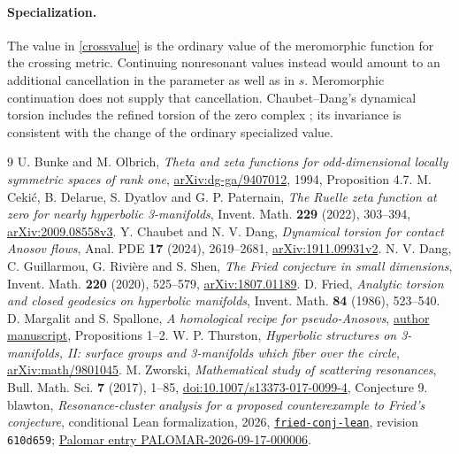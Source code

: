\documentclass[11pt]{article}
\begin{document}
\paragraph{Specialization.}
The value in \eqref{crossvalue} is the ordinary value of the meromorphic
function for the crossing metric. Continuing nonresonant values instead
would amount to an additional cancellation in the parameter as well as
in $s$. Meromorphic continuation does not supply that cancellation.
Chaubet--Dang's dynamical torsion includes the refined torsion of the
zero complex \cite[(6.7)]{CD}; its invariance is consistent with the
change of the ordinary specialized value.

\begin{thebibliography}{9}
 U. Bunke and M. Olbrich,
\emph{Theta and zeta functions for odd-dimensional locally symmetric spaces
of rank one}, \href{https://arxiv.org/abs/dg-ga/9407012}{arXiv:dg-ga/9407012},
1994, Proposition 4.7.
 M. Ceki\'c, B. Delarue, S. Dyatlov and G. P. Paternain,
\emph{The Ruelle zeta function at zero for nearly hyperbolic 3-manifolds},
Invent. Math. \textbf{229} (2022), 303--394,
\href{https://arxiv.org/abs/2009.08558}{arXiv:2009.08558v3}.
 Y. Chaubet and N. V. Dang,
\emph{Dynamical torsion for contact Anosov flows},
Anal. PDE \textbf{17} (2024), 2619--2681,
\href{https://arxiv.org/abs/1911.09931}{arXiv:1911.09931v2}.
 N. V. Dang, C. Guillarmou, G. Rivi\`ere and S. Shen,
\emph{The Fried conjecture in small dimensions},
Invent. Math. \textbf{220} (2020), 525--579,
\href{https://arxiv.org/abs/1807.01189}{arXiv:1807.01189}.
 D. Fried,
\emph{Analytic torsion and closed geodesics on hyperbolic manifolds},
Invent. Math. \textbf{84} (1986), 523--540.
 D. Margalit and S. Spallone,
\emph{A homological recipe for pseudo-Anosovs},
\href{https://margalit.droppages.net/papers/homcrit.pdf}{author manuscript},
Propositions 1--2.
 W. P. Thurston,
\emph{Hyperbolic structures on 3-manifolds, II: surface groups and
3-manifolds which fiber over the circle},
\href{https://arxiv.org/abs/math/9801045}{arXiv:math/9801045}.
 M. Zworski,
\emph{Mathematical study of scattering resonances},
Bull. Math. Sci. \textbf{7} (2017), 1--85,
\href{https://doi.org/10.1007/s13373-017-0099-4}{doi:10.1007/s13373-017-0099-4},
Conjecture 9.
 blawton,
\emph{Resonance-cluster analysis for a proposed counterexample to Fried's
conjecture}, conditional Lean formalization, 2026,
\href{https://github.com/blawton/fried-conj-lean/tree/610d659ea15af869553f6e3e79c432880d9b0ab0}
{\texttt{fried-conj-lean}}, revision \texttt{610d659};
\href{https://palomar-registry.org/entry?id=PALOMAR-2026-09-17-000006\&version=1}
{Palomar entry PALOMAR-2026-09-17-000006}.
\end{thebibliography}
\end{document}
